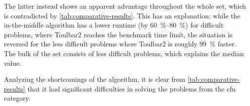 The latter instead shows an apparent advantage throughout the whole set, which is contradicted by \cref{tab:comparative-results}.
This has an explanation: while the in-the-middle algorithm has a lower runtime (by \SIrange{60}{80}{\percent}) for difficult problems, where Toulbar2 reaches the benchmark time limit, the situation is reversed for the less difficult problems where Toulbar2 is roughly \SI{99}{\percent} faster.
The bulk of the set consists of less difficult problems, which explains the median value.

Analyzing the shortcomings of the algorithm, it is clear from \cref{tab:comparative-results} that it had significant difficulties in solving the problems from the \gls{cfn} category.











